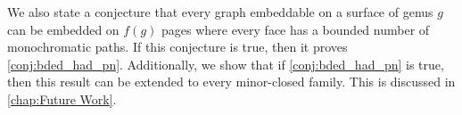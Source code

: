 We also state a conjecture that every graph embeddable on a surface of genus $g$ can be embedded on $f(g)$ pages where every face has a bounded number of monochromatic paths. If this conjecture is true, then it proves \cref{conj:bded_had_pn}. Additionally, we show that if \cref{conj:bded_had_pn} is true, then this result can be extended to every minor-closed family. This is discussed in \cref{chap:Future Work}.